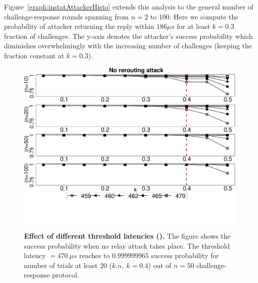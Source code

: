  Figure~\ref{graph:instatAttackerHisto} extends this analysis to the general number of challenge-response rounds spanning from $n=2$ to $100$. Here we compute the probability of attacker returning the reply within $186 \mu s$ for at least $k=0.3$ fraction of challenges. The y-axis denotes the attacker's success probability which diminishes overwhelmingly with the increasing number of challenges (keeping the fraction constant at $k=0.3$). 




\newcommand{\timeRoundCaption}{\textbf{Effect of different threshold latencies (\connect).} The figure shows the success probability when no relay attack takes place. The threshold latency \connect $=470\ \mu s$ reaches to $0.999999965$ success probability for number of trials at least 20 ($k.n,\ k=0.4$) out of $n=50$ challenge-response protocol.}

\newcommand{\cumulativeCaption}{\textbf{Cumulative distribution function for latencies.} We set the threshold \connect at 470 $\mu s$ which has a cumulative probability of $0.75$ in the experiment where no rerouting attack takes place with an extremely low probability ($9.73\times10^{-5}$).}

\ifusenix
\begin{figure}[t]
  \centering
    \includegraphics[trim={0 5cm 0 0}, clip, width=\linewidth]{data/graph/timeRound_new.pdf}
    \caption{\timeRoundCaption}
    \label{graph:diffTh}
\end{figure}

